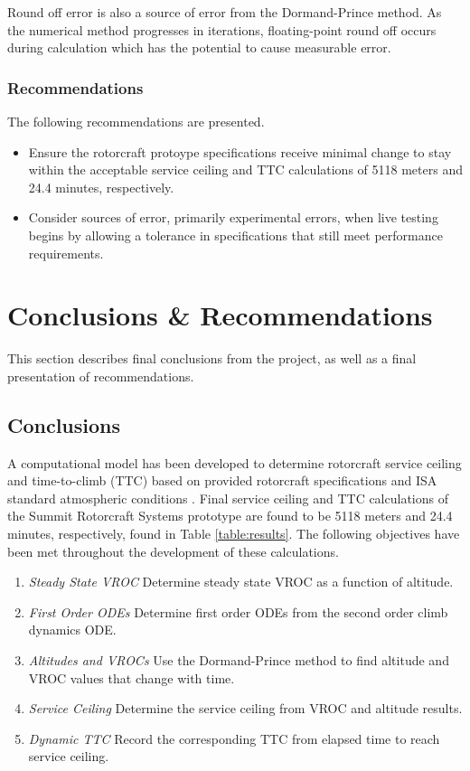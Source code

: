 \documentclass[12pt]{report}
\begin{document}
Round off error is also a source of error from the Dormand-Prince method. As the numerical method progresses in iterations,
floating-point round off occurs during calculation which has the potential to cause measurable error.


\subsection{Recommendations}

The following recommendations are presented.

\begin{itemize}
    \item Ensure the rotorcraft protoype specifications receive minimal change to stay within the acceptable service ceiling and
    TTC calculations of 5118 meters and 24.4 minutes, respectively.
    \item Consider sources of error, primarily experimental errors, when live testing begins by allowing a tolerance in
    specifications that still meet performance requirements.
\end{itemize}

\chapter{Conclusions \& Recommendations}

This section describes final conclusions from the project, as well as a final presentation of recommendations.

\section{Conclusions}

A computational model has been developed to determine rotorcraft service ceiling and time-to-climb (TTC) based on provided
rotorcraft specifications and ISA standard atmospheric conditions \cite{ISA}. Final service ceiling and TTC calculations of the
Summit Rotorcraft Systems prototype are found to be 5118 meters and 24.4 minutes, respectively, found in Table \ref{table:results}.
The following objectives have been met throughout the development of these calculations.

\begin{enumerate}
    \item \textit{Steady State VROC} Determine steady state VROC as a function of altitude.
    \item \textit{First Order ODEs} Determine first order ODEs from the second order climb dynamics ODE.
    \item \textit{Altitudes and VROCs} Use the Dormand-Prince method to find altitude and VROC values that change with time.
    \item \textit{Service Ceiling} Determine the service ceiling from VROC and altitude results.
    \item \textit{Dynamic TTC} Record the corresponding TTC from elapsed time to reach service ceiling.
\end{enumerate}
\end{document}
